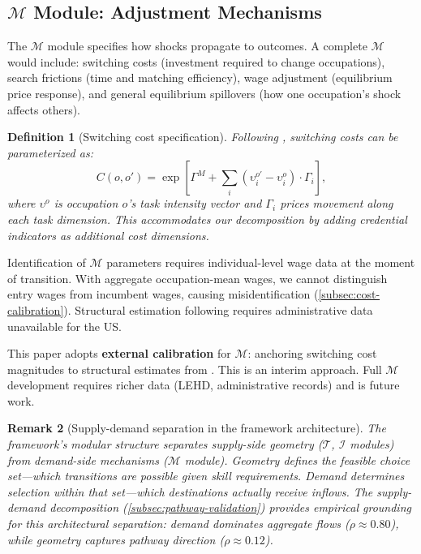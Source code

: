 \documentclass[12pt]{article}
\newtheorem{definition}{Definition}[section]
\newtheorem{remark}[definition]{Remark}
\begin{document}
\subsection{$\mathcal{M}$ Module: Adjustment Mechanisms}
\label{subsec:m-module}


The $\mathcal{M}$ module specifies how shocks propagate to outcomes. A complete $\mathcal{M}$ would include: switching costs (investment required to change occupations), search frictions (time and matching efficiency), wage adjustment (equilibrium price response), and general equilibrium spillovers (how one occupation's shock affects others).


\begin{definition}[Switching cost specification]
\label{def:switching-cost}
Following \citet{Traiberman2019}, switching costs can be parameterized as:
\[
C(o, o') = \exp\left[\Gamma^M + \sum_i (\upsilon^{o'}_i - \upsilon^o_i) \cdot \Gamma_i\right],
\]
where $\upsilon^o$ is occupation $o$'s task intensity vector and $\Gamma_i$ prices movement along each task dimension. This accommodates our decomposition by adding credential indicators as additional cost dimensions.
\end{definition}


Identification of $\mathcal{M}$ parameters requires individual-level wage data at the moment of transition. With aggregate occupation-mean wages, we cannot distinguish entry wages from incumbent wages, causing misidentification (\cref{subsec:cost-calibration}). Structural estimation following \citet{Traiberman2019} requires administrative data unavailable for the US.

This paper adopts \textbf{external calibration} for $\mathcal{M}$: anchoring switching cost magnitudes to structural estimates from \citet{DixCarneiro2014}. This is an interim approach. Full $\mathcal{M}$ development requires richer data (LEHD, administrative records) and is future work.

\begin{remark}[Supply-demand separation in the framework architecture]
\label{rem:supply-demand-separation}
The framework's modular structure separates supply-side geometry ($\mathcal{T}$, $\mathcal{I}$ modules) from demand-side mechanisms ($\mathcal{M}$ module). Geometry defines the feasible choice set---which transitions are possible given skill requirements. Demand determines selection within that set---which destinations actually receive inflows. The supply-demand decomposition (\cref{subsec:pathway-validation}) provides empirical grounding for this architectural separation: demand dominates aggregate flows ($\rho \approx 0.80$), while geometry captures pathway direction ($\rho \approx 0.12$).
\end{remark}
\end{document}
